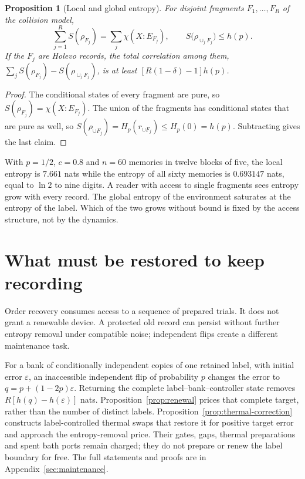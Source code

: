 \documentclass[12pt,a4paper]{article}
\newtheorem{proposition}[theorem]{Proposition}
\begin{document}
\begin{proposition}[Local and global entropy]
\label{prop:local-global}
For disjoint fragments $F_1,\dots,F_R$ of the collision model,
\[
\sum_{j=1}^RS(\rho_{F_j})=\sum_j\chi(X:E_{F_j}),\qquad S\bigl(\rho_{\cup_jF_j}\bigr)\le h(p).
\]
If the $F_j$ are Holevo records, the total correlation among them, $\sum_jS(\rho_{F_j})-S(\rho_{\cup_jF_j})$, is at least $[R(1-\delta)-1]h(p)$.
\end{proposition}

\begin{proof}
The conditional states of every fragment are pure, so $S(\rho_{F_j})=\chi(X:E_{F_j})$. The union of the fragments has conditional states that are pure as well, so $S(\rho_{\cup F_j})=H_p(r_{\cup F_j})\le H_p(0)=h(p)$. Subtracting gives the last claim.
\end{proof}

With $p=1/2$, $c=0.8$ and $n=60$ memories in twelve blocks of five, the local entropy is $7.661$ nats while the entropy of all sixty memories is $0.693147$ nats, equal to $\ln2$ to nine digits. A reader with access to single fragments sees entropy grow with every record. The global entropy of the environment saturates at the entropy of the label. Which of the two grows without bound is fixed by the access structure, not by the dynamics.

\section{What must be restored to keep recording}
\label{sec:renewal-interface}

Order recovery consumes access to a sequence of prepared trials.
It does not grant a renewable device. A protected old record can
persist without further entropy removal under compatible noise;
independent flips create a different maintenance task.

For a bank of conditionally independent copies of one retained label,
with initial error $\varepsilon$, an inaccessible independent flip
of probability $p$ changes the error to
$q=p+(1-2p)\varepsilon$. Returning the complete label--bank--controller
state removes $R[h(q)-h(\varepsilon)]$ nats.
Proposition~\ref{prop:renewal} prices that complete target, rather than
the number of distinct labels. Proposition~\ref{prop:thermal-correction}
constructs label-controlled thermal swaps that restore it for
positive target error and approach the entropy-removal price.
Their gates, gaps, thermal preparations and spent bath ports remain
charged; they do not prepare or renew the label boundary for free.
The full statements and proofs are in Appendix~\ref{sec:maintenance}.
\end{document}
